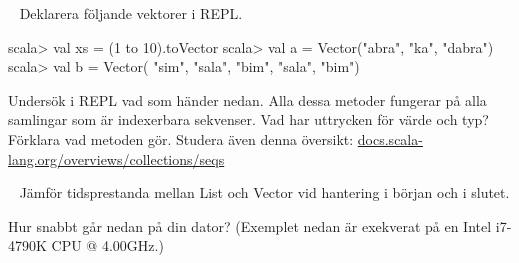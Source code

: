 {{\QUESTBEGIN

\Task  \what~  Deklarera följande vektorer i REPL.
\begin{REPL}
scala> val xs = (1 to 10).toVector
scala> val a = Vector("abra", "ka", "dabra")
scala> val b = Vector( "sim", "sala", "bim", "sala", "bim")
\end{REPL}
Undersök i REPL vad som händer nedan. Alla dessa metoder fungerar på alla samlingar som är indexerbara sekvenser. Vad har uttrycken för värde och typ? Förklara vad metoden gör. Studera även denna  översikt: \href{http://docs.scala-lang.org/overviews/collections/seqs}{docs.scala-lang.org/overviews/collections/seqs}

\Subtask {}  %

\Subtask {}  %

\Subtask {} %

\Subtask {} %

\Subtask {}  %

\Subtask {} %

\Subtask {}	%

\Subtask {} %

\Subtask {} %

\Subtask {} %



\SOLUTION


\QUESTEND







\QUESTBEGIN

\Task  \what~ Jämför tidsprestanda mellan List och Vector vid hantering i början och i slutet.

\Subtask Hur snabbt går nedan på din dator? (Exemplet nedan är exekverat på en Intel i7-4790K CPU @ 4.00GHz.) %

}}

